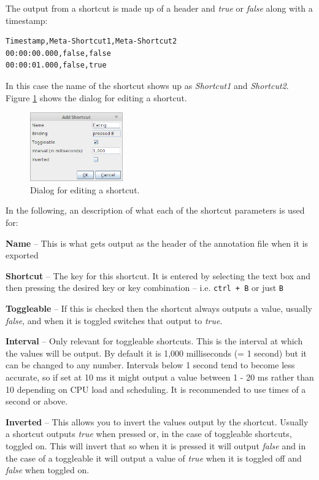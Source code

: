 \documentclass[a4paper]{book}
\begin{document}
The output from a shortcut is made up of a header and \textit{true} or
\textit{false} along with a timestamp:

\begin{verbatim}
Timestamp,Meta-Shortcut1,Meta-Shortcut2
00:00:00.000,false,false
00:00:01.000,false,true
\end{verbatim}

In this case the name of the shortcut shows up as \textit{Shortcut1} and
\textit{Shortcut2}. Figure \ref{AnnotatorAddShortcut} shows the dialog for editing a
shortcut.

\begin{figure}[htb]
  \centering
  \includegraphics[width=4.0cm]{images/AnnotatorAddShortcut.png}
  \caption{Dialog for editing a shortcut.}
  \label{AnnotatorAddShortcut}
\end{figure}

In the following, an description of what each of the shortcut parameters is
used for:
\begin{tight_itemize}
  \item \textbf{Name} -- This is what gets output as the header of the
  annotation file when it is exported
  \item \textbf{Shortcut} -- The key for this shortcut. It is entered by
  selecting the text box and then pressing the desired key or key combination
  -- i.e. \texttt{ctrl + B} or just \texttt{B}
  \item \textbf{Toggleable} -- If this is checked then the shortcut always
  outputs a value, usually \textit{false}, and when it is toggled switches
  that output to \textit{true}.
  \item \textbf{Interval} -- Only relevant for toggleable shortcuts. This is
  the interval at which the values will be output. By default it is 1,000
  milliseconds (= 1 second) but it can be changed to any number. Intervals
  below 1 second tend to become less accurate, so if set at 10 ms it might
  output a value between 1 - 20 ms rather than 10 depending on CPU load and
  scheduling. It is recommended to use times of a second or above.
  \item \textbf{Inverted} -- This allows you to invert the values output
  by the shortcut. Usually a shortcut outputs \textit{true} when pressed or, in the
  case of toggleable shortcuts, toggled on. This will invert that so when
  it is pressed it will output \textit{false} and in the case of a toggleable it
  will output a value of \textit{true} when it is toggled off and \textit{false} when toggled on.
\end{tight_itemize}
\end{document}
